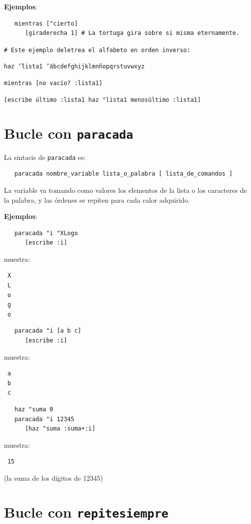 \noindent \textbf{Ejemplos}:

\begin{verbatim}
   mientras ["cierto]
      [giraderecha 1] # La tortuga gira sobre si misma eternamente. 
\end{verbatim}

\noindent \verb+# Este ejemplo deletrea el alfabeto en orden inverso:+

\noindent \texttt{haz \char`\"{}lista1 \char`\"{}abcdefghijklmn\~nopqrstuvwxyz}

\noindent \texttt{mientras [no vac\'io? :lista1]}

\texttt{[escribe \'ultimo :lista1 haz "lista1 menos\'ultimo :lista1]} 

\section{Bucle con \texttt{paracada}}
   \label{Bucle-con-paracada}

La sintacis de \texttt{paracada} es:
\begin{verbatim}
   paracada nombre_variable lista_o_palabra [ lista_de_comandos ] \end{verbatim}
La variable va tomando como valores los elementos de la lista o los caracteres de
la palabra, y las \'ordenes se repiten para cada calor adquirido.

\noindent \textbf{Ejemplos}:

\begin{verbatim}
   paracada "i "XLogo
      [escribe :i] \end{verbatim}
muestra:
\begin{verbatim}
 X
 L
 o
 g
 o
\end{verbatim}

\begin{verbatim}
   paracada "i [a b c]
      [escribe :i] \end{verbatim}
muestra:
\begin{verbatim}
 a
 b
 c
\end{verbatim}

\begin{verbatim}
   haz "suma 0
   paracada "i 12345
      [haz "suma :suma+:i] \end{verbatim}
muestra:
\begin{verbatim}
 15\end{verbatim} (la suma de los d\'igitos de 12345)

\section{Bucle con \texttt{repitesiempre}}
   \label{Bucle-con-repitesiempre}

